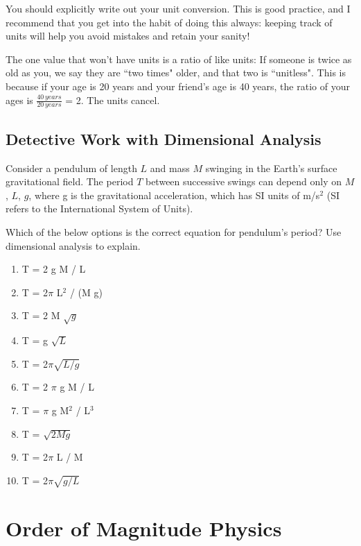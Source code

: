 \documentclass[12pt]{article}
\begin{document}
You should explicitly write out your unit conversion. This is good practice, and I recommend that you get into the habit of doing this always: keeping track of units will help you avoid mistakes and retain your sanity!

The one value that won't have units is a ratio of like units:
If someone is twice as old as you, we say they are ``two times" older, and
that two is ``unitless". This is because if your age is 20 years and your friend's age is 40 years, the ratio of your ages is $\frac{40 \,years}{20 \,years}$ = 2. The units cancel.

\subsection*{Detective Work with Dimensional Analysis}

Consider a pendulum of length $L$ and mass $M$ swinging in the Earth's
surface gravitational field.
The period $T$ between successive swings can depend only on $M$, $L$, $g$, where g is the gravitational acceleration, which has SI units of m/s$^2$ (SI refers to the International System of Units). 

Which of the below options is the correct equation for pendulum's period? Use dimensional analysis to
explain.




\begin{multicols}{2}
\begin{enumerate}
\item{ T = 2 g M / L}
\item{  T = 2$\pi$ L$^2$ / (M g)}
\item{  T = 2 M $\sqrt{g}$ }
\item{  T = g $\sqrt{L}$ }
\item{  T = 2$\pi \sqrt{L / g}$}

\item{ T = 2 $\pi$ g M / L }
\item{  T = $\pi$ g M$^2$ / L$^3$}
\item{  T = $\sqrt{2 M g}$ }
\item{  T = 2$\pi$ L / M }
\item{  T = 2$\pi \sqrt{g / L}$}

\end{enumerate}
\end{multicols}



\section*{Order of Magnitude Physics}
\end{document}
